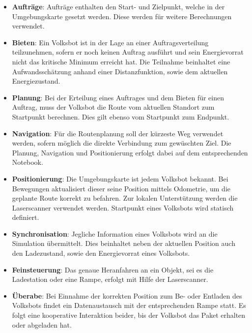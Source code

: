 \begin{itemize}

\item \textbf{Aufträge}: Aufträge enthalten den Start- und Zielpunkt, welche in der Umgebungskarte gesetzt werden. Diese werden für weitere Berechnungen verwendet.

\item \textbf{Bieten}: Ein Volksbot ist in der Lage an einer Auftragsverteilung teilzunehmen, sofern er noch keinen Auftrag ausführt und sein Energievorrat nicht das kritische Minimum erreicht hat. Die Teilnahme beinhaltet eine Aufwandsschätzung anhand einer Distanzfunktion, sowie dem aktuellen Energiezustand. 

\item \textbf{Planung}: Bei der Erteilung eines Auftrages und dem Bieten für einen Auftrag, muss der Volksbot die Route vom aktuellen Standort zum Startpunkt berechnen. Dies gilt ebenso vom Startpunkt zum Endpunkt.

\item \textbf{Navigation}: Für die Routenplanung soll der kürzeste Weg verwendet werden, sofern möglich die direkte Verbindung zum gewüschten Ziel. Die Planung, Navigation und Positionierung erfolgt dabei auf dem entsprechenden Notebook.

\item \textbf{Positionierung}: Die Umgebungskarte ist jedem Volksbot bekannt. Bei Bewegungen aktualisiert dieser seine Position mittels Odometrie, um die geplante Route korrekt zu befahren. Zur lokalen Unterstützung werden die Laserscanner verwendet werden. Startpunkt eines Volksbots wird statisch definiert.

\item \textbf{Synchronisation}: Jegliche Information eines Volksbots wird an die Simulation übermittelt. Dies beinhaltet neben der aktuellen Position auch den Ladezustand, sowie den Energievorrat eines Volksbots.

\item \textbf{Feinsteuerung}: Das genaue Heranfahren an ein Objekt, sei es die Ladestation oder eine Rampe, erfolgt mit Hilfe der Laserscanner. 

\item \textbf{Überabe}: Bei Einnahme der korrekten Position zum Be- oder Entladen des Volksbots findet ein Datenaustausch mit der entsprechenden Rampe statt. Es folgt eine kooperative Interaktion beider, bis der Volksbot das Paket erhalten oder abgeladen hat.


\end{itemize}
